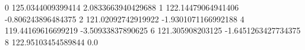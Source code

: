 0 125.0344009399414 2.0833663940429688
1 122.14479064941406 -0.806243896484375
2 121.02092742919922 -1.9301071166992188
4 119.44169616699219 -3.50933837890625
6 121.305908203125 -1.6451263427734375
8 122.95103454589844 0.0
